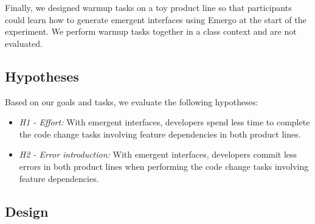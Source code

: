 

Finally, we designed warmup tasks on a toy product line so that participants could learn how to generate emergent interfaces using Emergo at the start of the experiment. We perform warmup tasks together in a class context and are not evaluated.

\subsection{Hypotheses}

Based on our goals and tasks, we evaluate the following hypotheses:

\begin{itemize}

	\item \textit{H1 - Effort:} With emergent interfaces, developers spend less time to complete the code change tasks involving feature dependencies in both product lines.

	\item \textit{H2 - Error introduction:}  With emergent interfaces, developers commit less errors in both product lines when performing the code change tasks involving feature dependencies.

\end{itemize}

\subsection{Design}

